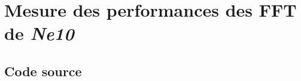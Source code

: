 \documentclass{article}
\begin{document}

\newpage
\section{Mesure des performances des FFT de \emph{Ne10}}\label{app:perf_fft_ne10}
\subsection{Code source}\label{app:perf_fft_ne10_code}
\end{document}
